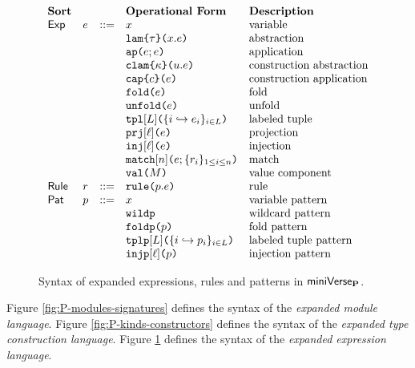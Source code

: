 \begin{figure}
\[\begin{array}{lllllll}
\textbf{Sort} & & & \textbf{Operational Form} 
& \textbf{Description}\\
\mathsf{Exp} & e & ::= & x 
& \text{variable}\\
&&& \aelam{\tau}{x}{e} 
& \text{abstraction}\\
&&& \aeap{e}{e} 
& \text{application}\\
&&& \aeclam{\kappa}{u}{e} %
& \text{construction abstraction}\\
&&& \aecap{e}{c} %
& \text{construction application}\\
&&& \aefold{e} %
& \text{fold}\\
&&& \aeunfold{e} %
& \text{unfold}\\
&&& \aetpl{\labelset}{\mapschema{e}{i}{\labelset}} 
& \text{labeled tuple}\\
&&& \aepr{\ell}{e} 
& \text{projection}\\
&&& \aein{\ell}{e} 
& \text{injection}\\
&&& \aematchwith{n}{e}{\seqschemaX{r}} 
& \text{match}\\
&&& \amval{M} 
& \text{value component}\\
\mathsf{Rule} & r & ::= & \aematchrule{p}{e} 
& \text{rule}\\
\mathsf{Pat} & p & ::= & x 
& \text{variable pattern}\\
&&& \aewildp 
& \text{wildcard pattern}\\
&&& \aefoldp{p} 
& \text{fold pattern}\\
&&& \aetplp{\labelset}{\mapschema{p}{i}{\labelset}} 
& \text{labeled tuple pattern}\\
&&& \aeinjp{\ell}{p} 
& \text{injection pattern}
\end{array}\]
\caption[Syntax of expanded expressions, rules and patterns in $\miniVerseParam$]{Syntax of expanded expressions, rules and patterns in $\miniVerseParam$.}
\label{fig:P-expanded-terms}
\end{figure}


Figure \ref{fig:P-modules-signatures} defines the syntax of the \emph{expanded module language}. Figure \ref{fig:P-kinds-constructors} defines the syntax of the \emph{expanded type construction language}. Figure \ref{fig:P-expanded-terms} defines the syntax of the \emph{expanded expression language}.


